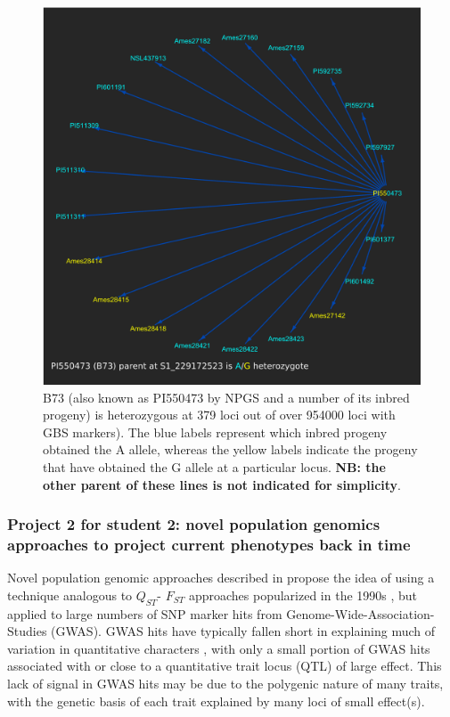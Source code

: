 \documentclass[12pt]{article}
\begin{document}
\begin{figure}[p]
\includegraphics[width=1.0\linewidth]{Pruned.pdf}
\caption{B73 (also known as PI550473 by NPGS and a number of its inbred progeny) is heterozygous at 379 loci out of over 954000 loci with GBS markers). The blue labels represent which inbred progeny obtained the A allele, whereas the yellow labels indicate the progeny that have obtained the G allele at a particular locus. \textbf{NB: the other parent of these lines is not indicated for simplicity}.}
\label{fig:alleledrop}
\end{figure}






\subsubsection*{Project 2 for student 2: novel population genomics approaches to project current phenotypes back in time}
Novel population genomic approaches described in \cite{Berg:2014bs} propose the idea of using a technique analogous to $Q_{ST}$- $F_{ST}$ approaches popularized in the 1990s \citep{Latta:1998ek,  McKay:2002wi}, but applied to large numbers of SNP marker hits from Genome-Wide-Association-Studies (GWAS). 
GWAS hits have typically fallen short in explaining much of variation in quantitative characters \citep{Rockman:2011ej}, with only a small portion of GWAS hits associated with or close to a quantitative trait locus (QTL) of large effect. 
This lack of signal in GWAS hits may be due to the polygenic nature of many traits, with the genetic basis of each trait explained by many loci of small effect(s). 
\end{document}
